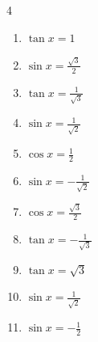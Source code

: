 \begin{multicols}{4}
\begin{enumerate}
  \item $\displaystyle \tan{x}  = 1$


  \item $\displaystyle \sin{x}  = \frac{\sqrt{3}}{2}$


  \item $\displaystyle \tan{x}  = \frac{1}{\sqrt{3}}$


  \item $\displaystyle \sin{x}  = \frac{1}{\sqrt{2}}$


  \item $\displaystyle \cos{x}  = \frac{1}{2}$


  \item $\displaystyle \sin{x}  = -\frac{1}{\sqrt{2}}$


  \item $\displaystyle \cos{x}  = \frac{\sqrt{3}}{2}$


\columnbreak %

\resetques

  \item $\displaystyle \tan{x}  = -\frac{1}{\sqrt{3}}$


  \item $\displaystyle \tan{x}  = \sqrt{3}$


  \item $\displaystyle \sin{x}  = \frac{1}{\sqrt{2}}$


  \item $\displaystyle \sin{x}  = -\frac{1}{2}$


\end{enumerate}
\end{multicols}
